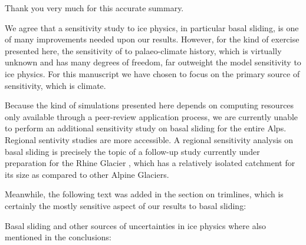    Thank you very much for this accurate summary.


    We agree that a sensitivity study to ice physics, in particular basal
    sliding, is one of many improvements needed upon our results. However, for
    the kind of exercise presented here, the sensitivity of to palaeo-climate
    history, which is virtually unknown and has many degrees of freedom, far
    outweight the model sensitivity to ice physics. For this manuscript we have
    chosen to focus on the primary source of sensitivity, which is climate.

    Because the kind of simulations presented here depends on computing
    resources only available through a peer-review application process, we are
    currently unable to perform an additional sensitivity study on basal
    sliding for the entire Alps.  Regional sentivity studies are more
    accessible. A regional sensitivity analysis on basal sliding is precisely
    the topic of a follow-up study currently under preparation for the Rhine
    Glacier \citep{Imhof.etal.2017}, which has a relatively isolated catchment
    for its size as compared to other Alpine Glaciers.

    Meanwhile, the following text was added in the section on trimlines, which
    is certainly the mostly sensitive aspect of our results to basal sliding:


    Basal sliding and other sources of uncertainties in ice physics where also
    mentioned in the conclusions:

